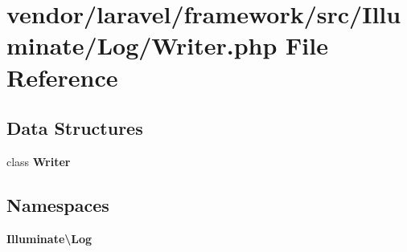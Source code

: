 \section{vendor/laravel/framework/src/\+Illuminate/\+Log/\+Writer.php File Reference}
\label{_writer_8php}
\subsection*{Data Structures}
\begin{DoxyCompactItemize}
\item 
class {\bf Writer}
\end{DoxyCompactItemize}
\subsection*{Namespaces}
\begin{DoxyCompactItemize}
\item 
 {\bf Illuminate\textbackslash{}\+Log}
\end{DoxyCompactItemize}
